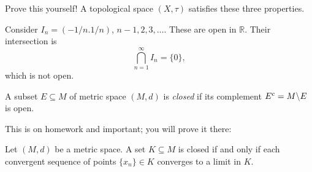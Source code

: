 \documentclass[11pt]{article}
\theoremstyle{definition}
\newcommand{\R}{\mathbb{R}}                      %
\newcommand{\bslash}{\symbol{92}}
\begin{document}
Prove this yourself!
A topological space $(X,\tau)$ satisfies these three properties.

\ex Consider $I_n=(-1/n.1/n)$, $n-1,2,3,\dots$. These are open in $\R$. Their intersection is
$$
\bigcap_{n=1}^\infty I_n =\{0\},
$$
which is not open.

 A subset $E\subseteq M$ of metric space $(M,d)$ is \textit{closed} if its complement $E^c=M\bslash E$ is open.

This is on homework and important; you will prove it there:

\prop Let $(M,d)$ be a metric space. A set $K\subseteq M$ is closed if and only if each convergent sequence of points $\{x_n\}\in K$ converges to a limit in $K$.
\end{document}
